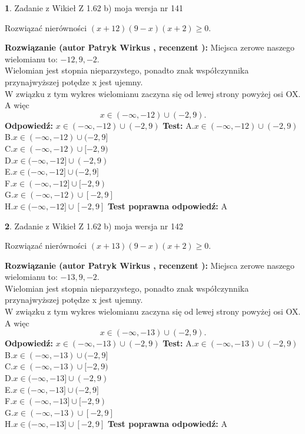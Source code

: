 \documentclass[12pt, a4paper]{article}
\theoremstyle{definition} %
\newtheorem{zad}{}
\newcommand{\zadStart}[1]{\begin{zad}#1\newline}
\newcommand{\zadStop}{\end{zad}}
\newcommand{\rozwStart}[2]{\noindent \textbf{Rozwiązanie (autor #1 , recenzent #2): }\newline}
\newcommand{\rozwStop}{\newline}
\newcommand{\odpStart}{\noindent \textbf{Odpowiedź:}\newline}
\newcommand{\odpStop}{\newline}
\newcommand{\testStart}{\noindent \textbf{Test:}\newline}
\newcommand{\testStop}{\newline}
\newcommand{\kluczStart}{\noindent \textbf{Test poprawna odpowiedź:}\newline}
\newcommand{\kluczStop}{\newline}
\begin{document}
\zadStart{Zadanie z Wikieł Z 1.62 b) moja wersja nr 141}

Rozwiązać nierówności $(x+12)(9-x)(x+2)\ge0$.
\zadStop
\rozwStart{Patryk Wirkus}{}
Miejsca zerowe naszego wielomianu to: $-12, 9, -2$.\\
Wielomian jest stopnia nieparzystego, ponadto znak współczynnika przy\linebreak najwyższej potędze x jest ujemny.\\ W związku z tym wykres wielomianu zaczyna się od lewej strony powyżej osi OX. A więc $$x \in (-\infty,-12) \cup (-2,9).$$
\rozwStop
\odpStart
$x \in (-\infty,-12) \cup (-2,9)$
\odpStop
\testStart
A.$x \in (-\infty,-12) \cup (-2,9)$\\
B.$x \in (-\infty,-12) \cup (-2,9]$\\
C.$x \in (-\infty,-12) \cup [-2,9)$\\
D.$x \in (-\infty,-12] \cup (-2,9)$\\
E.$x \in (-\infty,-12] \cup (-2,9]$\\
F.$x \in (-\infty,-12] \cup [-2,9)$\\
G.$x \in (-\infty,-12) \cup [-2,9]$\\
H.$x \in (-\infty,-12] \cup [-2,9]$
\testStop
\kluczStart
A
\kluczStop



\zadStart{Zadanie z Wikieł Z 1.62 b) moja wersja nr 142}

Rozwiązać nierówności $(x+13)(9-x)(x+2)\ge0$.
\zadStop
\rozwStart{Patryk Wirkus}{}
Miejsca zerowe naszego wielomianu to: $-13, 9, -2$.\\
Wielomian jest stopnia nieparzystego, ponadto znak współczynnika przy\linebreak najwyższej potędze x jest ujemny.\\ W związku z tym wykres wielomianu zaczyna się od lewej strony powyżej osi OX. A więc $$x \in (-\infty,-13) \cup (-2,9).$$
\rozwStop
\odpStart
$x \in (-\infty,-13) \cup (-2,9)$
\odpStop
\testStart
A.$x \in (-\infty,-13) \cup (-2,9)$\\
B.$x \in (-\infty,-13) \cup (-2,9]$\\
C.$x \in (-\infty,-13) \cup [-2,9)$\\
D.$x \in (-\infty,-13] \cup (-2,9)$\\
E.$x \in (-\infty,-13] \cup (-2,9]$\\
F.$x \in (-\infty,-13] \cup [-2,9)$\\
G.$x \in (-\infty,-13) \cup [-2,9]$\\
H.$x \in (-\infty,-13] \cup [-2,9]$
\testStop
\kluczStart
A
\kluczStop
\end{document}

